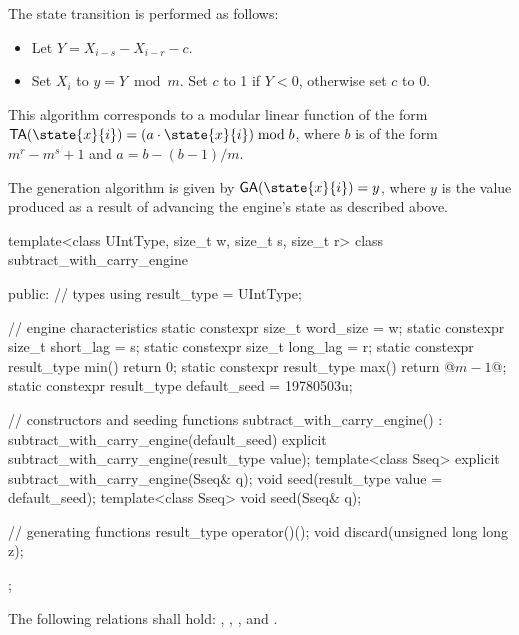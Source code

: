 \pnum
The state transition%
%
is performed as follows:
\begin{itemize}
 \item
   Let $Y = X_{i-s} - X_{i-r} - c$.
 \item
   Set $X_i$ to $y = Y \bmod m$.
   Set $c$ to 1 if $Y < 0$,
   otherwise set $c$ to 0.
\end{itemize}
\begin{note}
 This algorithm corresponds
 to a modular linear function
 of the form
 $\mathsf{TA}(\state{x}{i}) = (a \cdot \state{x}{i}) \bmod b$,
 where $b$ is of the form
 $m^r - m^s + 1$
 and $a = b - (b - 1) / m$.
\end{note}

\pnum
The generation algorithm%
%
is given by $\mathsf{GA}(\state{x}{i}) = y$,
where $y$ is the value produced as a result
of advancing the engine's state as described above.

%
\begin{codeblock}
template<class UIntType, size_t w, size_t s, size_t r>
  class subtract_with_carry_engine {
  public:
    // types
    using result_type = UIntType;

    // engine characteristics
    static constexpr size_t word_size = w;
    static constexpr size_t short_lag = s;
    static constexpr size_t long_lag = r;
    static constexpr result_type min() { return 0; }
    static constexpr result_type max() { return @$m - 1$@; }
    static constexpr result_type default_seed = 19780503u;

    // constructors and seeding functions
    subtract_with_carry_engine() : subtract_with_carry_engine(default_seed) {}
    explicit subtract_with_carry_engine(result_type value);
    template<class Sseq> explicit subtract_with_carry_engine(Sseq& q);
    void seed(result_type value = default_seed);
    template<class Sseq> void seed(Sseq& q);

    // generating functions
    result_type operator()();
    void discard(unsigned long long z);
  };
\end{codeblock}

\pnum
The following relations shall hold:
  ,
  ,
  ,
and
  .

